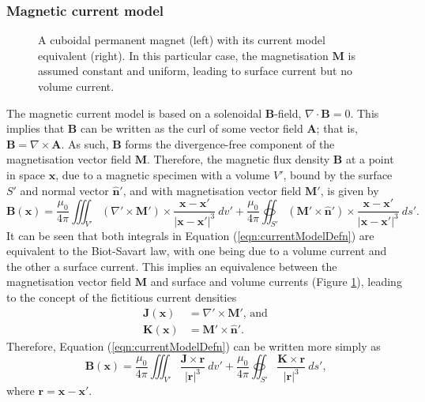 \subsubsection{Magnetic current model}
\begin{figure}
    \centering
    \hfill
    \begin{subfigure}{0.4\textwidth}
        
    \end{subfigure} \hfill
    \begin{subfigure}{0.4\textwidth}
        
    \end{subfigure}
    \hfill
    \caption{A cuboidal permanent magnet (left) with its current model equivalent (right). In this particular case, the magnetisation \(\mathbf{M}\) is assumed constant and uniform, leading to surface current but no volume current.}
    \label{fig:currentModelSchematic}
\end{figure}
The magnetic current model is based on a solenoidal \(\mathbf{B}\)-field, \(\nabla \cdot \mathbf{B} = 0\). This implies that \(\mathbf{B}\) can be written as the curl of some vector field \(\mathbf{A}\); that is, \(\mathbf{B} = \nabla \times \mathbf{A}\). As such, \(\mathbf{B}\) forms the divergence-free component of the magnetisation vector field \(\mathbf{M}\). Therefore, the magnetic flux density \(\mathbf{B}\) at a point in space \(\mathbf{x}\), due to a magnetic specimen with a volume \(V'\), bound by the surface \(S'\) and normal vector \(\hat{\mathbf{n}}'\), and with magnetisation vector field \(\mathbf{M}'\), is given by
\begin{equation}\label{eqn:currentModelDefn}
    \mathbf{B}\left(\mathbf{x}\right) = \frac{\mu_0}{4\pi} \iiint_{V'} \left(\nabla' \times \mathbf{M}'\right) \times \frac{\mathbf{x}-\mathbf{x}'}{\left|\mathbf{x}-\mathbf{x}'\right|^3}\ dv' + \frac{\mu_0}{4\pi} \oiint_{S'} \left( \mathbf{M}' \times \hat{\mathbf{n}}' \right) \times \frac{\mathbf{x}-\mathbf{x}'}{\left|\mathbf{x}-\mathbf{x}'\right|^3}\ ds' \text{.}
\end{equation}
It can be seen that both integrals in Equation (\ref{eqn:currentModelDefn}) are equivalent to the Biot-Savart law, with one being due to a volume current and the other a surface current. This implies an equivalence between the magnetisation vector field \(\mathbf{M}\) and surface and volume currents (Figure \ref{fig:currentModelSchematic}), leading to the concept of the fictitious current densities
\begin{align}
    \mathbf{J}\left(\mathbf{x}\right) &= \nabla' \times \mathbf{M}' \text{, and} \\
    \mathbf{K}\left(\mathbf{x}\right) &= \mathbf{M}' \times \hat{\mathbf{n}}' \text{.}
\end{align}
Therefore, Equation (\ref{eqn:currentModelDefn}) can be written more simply as
\begin{equation}
    \mathbf{B}\left(\mathbf{x}\right) = \frac{\mu_0}{4\pi} \iiint_{V'} \frac{\mathbf{J} \times \mathbf{r}}{\left|\mathbf{r}\right|^3}\ dv' + \frac{\mu_0}{4\pi} \oiint_{S'} \frac{\mathbf{K} \times \mathbf{r}}{\left|\mathbf{r}\right|^3}\ ds' \text{,}
\end{equation}
where \(\mathbf{r} = \mathbf{x} - \mathbf{x}'\).

